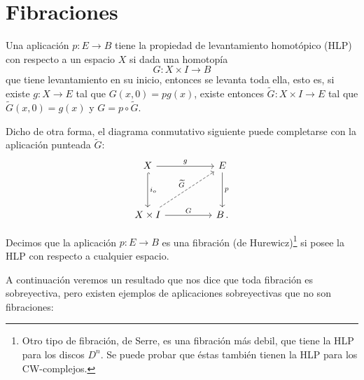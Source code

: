 \section{Fibraciones}
\begin{defin}
Una aplicación $p : E \longrightarrow B$ tiene la propiedad de levantamiento homotópico (HLP) con respecto a un espacio $X$ si dada una homotopía 
\[
G : X \times I \longrightarrow B
\]
que tiene levantamiento en su inicio, entonces se levanta toda ella, esto es, si existe $g : X \longrightarrow E$ tal que  $G(x, 0) = pg(x)$, existe entonces $\widetilde{G} : X \times I \longrightarrow E$ tal que $\widetilde{G}(x,0) = g(x)$ y $G = p \circ \widetilde{G}$. \par
Dicho de otra forma, el diagrama conmutativo siguiente puede completarse con la aplicación punteada $\widetilde{G}$:
\[
\begin{tikzcd}
X \arrow{rr}{g} \arrow[hook]{dd}{i_o} &  & E \arrow{dd}{p} \\
\\
X \times I \arrow{rr}{G} \arrow[dashed]{uurr}{\widetilde{G}} & & B \, .
\end{tikzcd}
\]
\end{defin}
\begin{defin}
Decimos que la aplicación $p : E \longrightarrow B$ es una fibración (de Hurewicz)\footnote{Otro tipo de fibración, de Serre, es una fibración más debil, que tiene la HLP para los discos $D^n$. Se puede probar que éstas también tienen la HLP para los CW-complejos.} si posee la HLP con respecto a cualquier espacio.
\end{defin}
A continuación veremos un resultado que nos dice que toda fibración es sobreyectiva, pero existen ejemplos de aplicaciones sobreyectivas que no son fibraciones:
